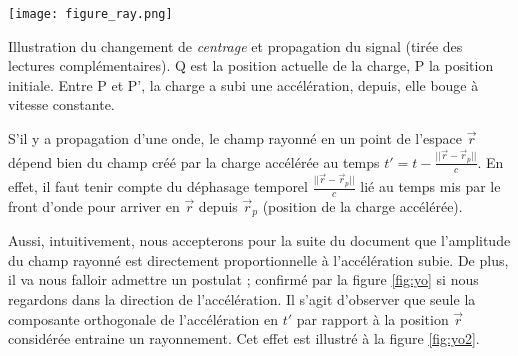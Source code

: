 \begin{marginfigure}[1.5cm]
	\centering
	\texttt{[image: figure\_ray.png]}
	\caption{Illustration du changement de \textit{centrage} et propagation du signal (tirée des lectures complémentaires). Q est la position actuelle de la charge, P la position initiale. Entre P et P', la charge a subi une accélération, depuis, elle bouge à vitesse constante.}%
	\label{fig:yo2}
\end{marginfigure}

S'il y a propagation d'une onde, le champ rayonné en un point de l'espace $\vec{r}$ dépend bien du champ créé par la charge accélérée au temps $t' = t - \frac{|| \vec{r} - \vec{r}_{p} ||}{c}$. En effet, il faut tenir compte du déphasage temporel $\frac{||\vec{r} - \vec{r}_{p} ||}{c}$ lié au temps mis par le front d'onde pour arriver en $\vec{r}$ depuis $\vec{r}_{p}$ (position de la charge accélérée).

Aussi, intuitivement, nous accepterons pour la suite du document que l'amplitude du champ rayonné est directement proportionnelle à l'accélération subie. De plus, il va nous falloir admettre un postulat ; confirmé par la figure \ref{fig:yo} si nous regardons dans la direction de l'accélération. Il s'agit d'observer que seule la composante orthogonale de l'accélération en $t'$ par rapport à la position $\vec{r}$ considérée entraine un rayonnement. Cet effet est illustré à la figure \ref{fig:yo2}.


